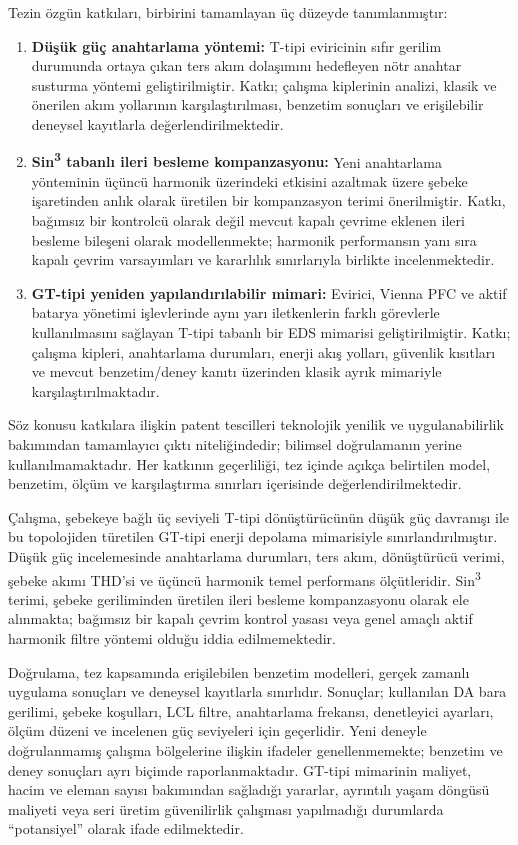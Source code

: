 Tezin özgün katkıları, birbirini tamamlayan üç düzeyde tanımlanmıştır:

\begin{enumerate}
  \item \textbf{Düşük güç anahtarlama yöntemi:} T-tipi eviricinin sıfır gerilim durumunda ortaya çıkan ters akım dolaşımını hedefleyen nötr anahtar susturma yöntemi geliştirilmiştir. Katkı; çalışma kiplerinin analizi, klasik ve önerilen akım yollarının karşılaştırılması, benzetim sonuçları ve erişilebilir deneysel kayıtlarla değerlendirilmektedir.
  \item \textbf{Sin\textsuperscript{3} tabanlı ileri besleme kompanzasyonu:} Yeni anahtarlama yönteminin üçüncü harmonik üzerindeki etkisini azaltmak üzere şebeke işaretinden anlık olarak üretilen bir kompanzasyon terimi önerilmiştir. Katkı, bağımsız bir kontrolcü olarak değil mevcut kapalı çevrime eklenen ileri besleme bileşeni olarak modellenmekte; harmonik performansın yanı sıra kapalı çevrim varsayımları ve kararlılık sınırlarıyla birlikte incelenmektedir.
  \item \textbf{GT-tipi yeniden yapılandırılabilir mimari:} Evirici, Vienna PFC ve aktif batarya yönetimi işlevlerinde aynı yarı iletkenlerin farklı görevlerle kullanılmasını sağlayan T-tipi tabanlı bir EDS mimarisi geliştirilmiştir. Katkı; çalışma kipleri, anahtarlama durumları, enerji akış yolları, güvenlik kısıtları ve mevcut benzetim/deney kanıtı üzerinden klasik ayrık mimariyle karşılaştırılmaktadır.
\end{enumerate}

Söz konusu katkılara ilişkin patent tescilleri teknolojik yenilik ve uygulanabilirlik bakımından tamamlayıcı çıktı niteliğindedir; bilimsel doğrulamanın yerine kullanılmamaktadır. Her katkının geçerliliği, tez içinde açıkça belirtilen model, benzetim, ölçüm ve karşılaştırma sınırları içerisinde değerlendirilmektedir.

Çalışma, şebekeye bağlı üç seviyeli T-tipi dönüştürücünün düşük güç davranışı ile bu topolojiden türetilen GT-tipi enerji depolama mimarisiyle sınırlandırılmıştır. Düşük güç incelemesinde anahtarlama durumları, ters akım, dönüştürücü verimi, şebeke akımı THD'si ve üçüncü harmonik temel performans ölçütleridir. Sin\textsuperscript{3} terimi, şebeke geriliminden üretilen ileri besleme kompanzasyonu olarak ele alınmakta; bağımsız bir kapalı çevrim kontrol yasası veya genel amaçlı aktif harmonik filtre yöntemi olduğu iddia edilmemektedir.

Doğrulama, tez kapsamında erişilebilen benzetim modelleri, gerçek zamanlı uygulama sonuçları ve deneysel kayıtlarla sınırlıdır. Sonuçlar; kullanılan DA bara gerilimi, şebeke koşulları, LCL filtre, anahtarlama frekansı, denetleyici ayarları, ölçüm düzeni ve incelenen güç seviyeleri için geçerlidir. Yeni deneyle doğrulanmamış çalışma bölgelerine ilişkin ifadeler genellenmemekte; benzetim ve deney sonuçları ayrı biçimde raporlanmaktadır. GT-tipi mimarinin maliyet, hacim ve eleman sayısı bakımından sağladığı yararlar, ayrıntılı yaşam döngüsü maliyeti veya seri üretim güvenilirlik çalışması yapılmadığı durumlarda ``potansiyel'' olarak ifade edilmektedir.


